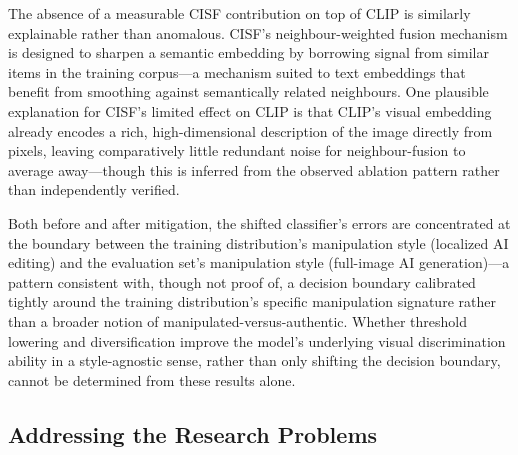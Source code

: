 \documentclass[conference,a4paper]{IEEEtran}
\begin{document}
The absence of a measurable CISF contribution on top of CLIP is similarly
explainable rather than anomalous. CISF's neighbour-weighted fusion mechanism
is designed to sharpen a semantic embedding by borrowing signal from similar
items in the training corpus---a mechanism suited to text embeddings that
benefit from smoothing against semantically related neighbours. One plausible
explanation for CISF's limited effect on CLIP is that CLIP's visual embedding
already encodes a rich, high-dimensional description of the image directly
from pixels, leaving comparatively little redundant noise for neighbour-fusion
to average away---though this is inferred from the observed ablation pattern
rather than independently verified.

Both before and after mitigation, the shifted classifier's errors are
concentrated at the boundary between the training distribution's manipulation
style (localized AI editing) and the evaluation set's manipulation style
(full-image AI generation)---a pattern consistent with, though not proof of, a
decision boundary calibrated tightly around the training distribution's
specific manipulation signature rather than a broader notion of
manipulated-versus-authentic. Whether threshold lowering and diversification
improve the model's underlying visual discrimination ability in a
style-agnostic sense, rather than only shifting the decision boundary, cannot
be determined from these results alone.

\subsection{Addressing the Research Problems}
\end{document}
